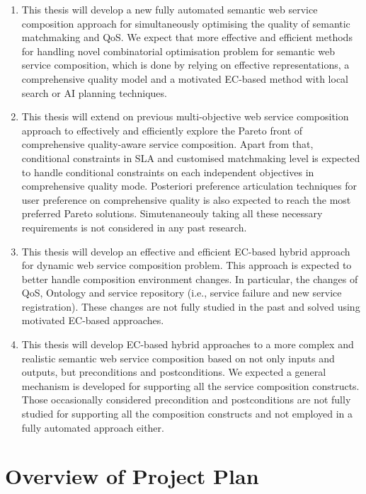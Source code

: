 \begin{enumerate}
 \item This thesis will develop a new fully automated semantic web service composition approach for simultaneously optimising the quality of semantic matchmaking and QoS. We expect that more effective and efficient methods for handling novel combinatorial optimisation problem for semantic web service composition, which is done by relying on effective representations, a comprehensive quality model and a motivated EC-based method with local search or AI planning techniques.

\item This thesis will extend on previous multi-objective web service composition approach to effectively and efficiently explore the Pareto front of comprehensive quality-aware service composition. Apart from that, conditional constraints in SLA and customised matchmaking level is expected to handle conditional constraints on each independent objectives in comprehensive quality mode. Posteriori preference articulation techniques for user preference on comprehensive quality is also expected to reach the most preferred Pareto solutions. Simutenaneouly taking all these necessary requirements is not considered in any past research.

\item This thesis will develop an effective and efficient EC-based hybrid approach for dynamic web service composition problem. This approach is expected to better handle composition environment changes. In particular, the changes of QoS, Ontology and service repository (i.e., service failure and new service registration). These changes are not fully studied in the past and solved using motivated EC-based approaches.

\item This thesis will develop EC-based hybrid approaches to a more complex and realistic semantic web service composition based on not only inputs and outputs, but preconditions and postconditions. We expected a general mechanism is developed for supporting all the service composition constructs. Those occasionally considered precondition and postconditions are not fully studied for supporting all the composition constructs and not employed in a fully automated approach either.
\end{enumerate}

\section{Overview of Project Plan}

